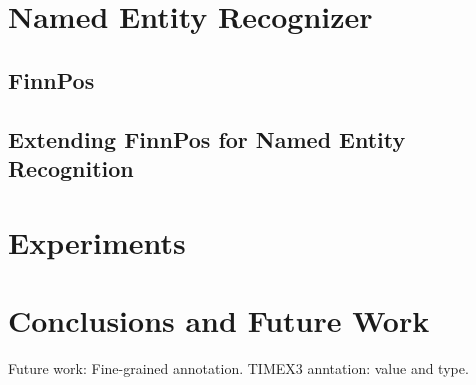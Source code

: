 \documentclass[11pt]{article}
\begin{document}
\section{Named Entity Recognizer}
\label{sec: named entity recognizer}


\subsection{FinnPos}



\subsection{Extending FinnPos for Named Entity Recognition}




\section{Experiments}
\label{sec: experiments}




\section{Conclusions and Future Work}
\label{sec: conclusions}


Future work: Fine-grained annotation. TIMEX3 anntation: value and type.



\newpage

%

\end{document}

